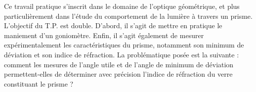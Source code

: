 Ce travail pratique s'inscrit dans le domaine de l'optique géométrique, 
et plus particulièrement dans l'étude du comportement de la lumière à travers un prisme.
L'objectif du T.P. est double. 
D'abord, il s'agit de mettre en pratique le maniement d'un goniomètre. 
Enfin, il s'agit également de mesurer expérimentalement les caractéristiques du prisme, 
notamment son minimum de déviation et son indice de réfraction.
La problématique posée est la suivante : 
comment les mesures de l'angle utile et de l'angle de minimum de déviation permettent-elles de déterminer avec précision l'indice de réfraction du verre constituant le prisme ?